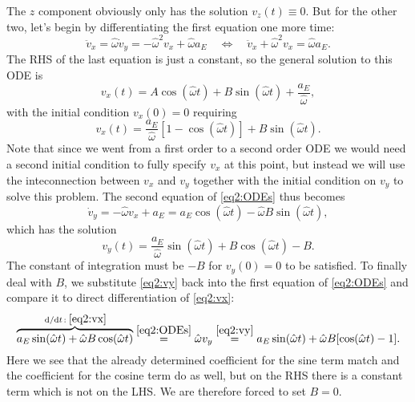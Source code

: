 \documentclass[11pt,a4paper, 
english, swedish %
]{article}
\begin{document}
The $z$ component obviously only has the solution $v_z(t)\equiv0$. But
for the other two, let's begin by differentiating the first equation
one more time:
\begin{equation}
\ddot{v}_x = \hat\omega \dot{v}_y
=-\hat\omega^2 {v}_x + \hat\omega a_E
\quad\Longleftrightarrow\quad
\ddot{v}_x + \hat\omega^2 {v}_x = \hat\omega a_E.
\end{equation}
The RHS of the last equation is just a constant, so the general
solution to this ODE is
\begin{equation}
v_x(t) = A\cos(\hat\omega t) + B\sin(\hat\omega t) 
+ \frac{a_E}{\hat\omega},
\end{equation}
with the initial condition $v_x(0)=0$ requiring
\begin{equation}\label{eq2:vx}
v_x(t) = \frac{a_E}{\hat\omega}[1-\cos(\hat\omega t)]
 + B\sin(\hat\omega t).
\end{equation}
Note that since we went from a first order to a second order ODE we
would need a second initial condition to fully specify $v_x$ at this
point, but instead we will use the inteconnection between $v_x$ and
$v_y$ together with the initial condition on $v_y$ to solve this
problem. The second equation of \eqref{eq2:ODEs} thus becomes
\begin{equation}
\dot{v}_y = -\hat\omega v_x + a_E
=a_E\cos(\hat\omega t)
 - \hat\omega B\sin(\hat\omega t),
\end{equation}
which has the solution 
\begin{equation}\label{eq2:vy}
v_y(t) = \frac{a_E}{\hat\omega}\sin(\hat\omega t)
+B\cos(\hat\omega t) -B.
\end{equation}
The constant of integration must be $-B$ for $v_y(0)=0$ to be
satisfied. To finally deal with $B$, we substitute \eqref{eq2:vy} back
into the first equation of \eqref{eq2:ODEs} and compare it to direct
differentiation of \eqref{eq2:vx}:
\begin{equation}
\overbrace{a_E\sin(\hat\omega t) + \hat\omega B\cos(\hat\omega t)}
^{\dv*{t}:\;\eqref{eq2:vx}}
\stackrel{\eqref{eq2:ODEs}}{=}
\hat\omega v_y
\stackrel{\eqref{eq2:vy}}{=}
a_E\sin(\hat\omega t)
+\hat\omega B [\cos(\hat\omega t)-1].
\end{equation}
Here we see that the already determined coefficient for the sine term
match and the coefficient for the cosine term do as well, but on the
RHS there is a constant term which is not on the LHS. We are therefore
forced to set $B=0$. 
\end{document}
